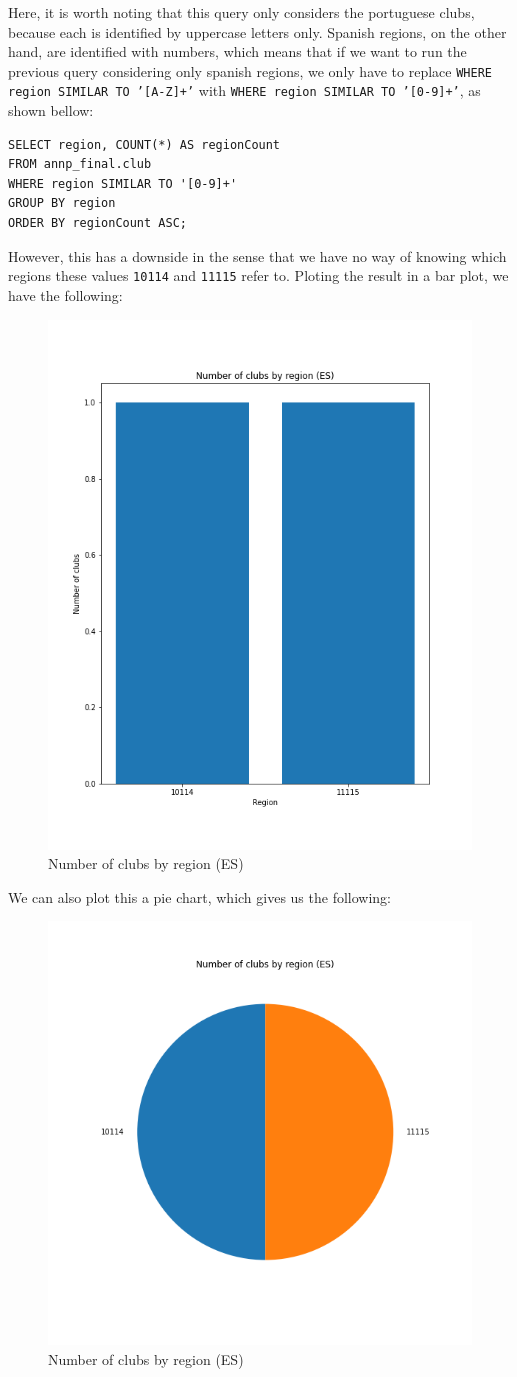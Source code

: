 Here, it is worth noting that this query only considers the portuguese clubs, because each is identified by uppercase
letters only.
Spanish regions, on the other hand, are identified with numbers, which means that if we want to run the previous query
considering only spanish regions, we only have to replace \texttt{WHERE region SIMILAR TO '[A-Z]+'} with
\texttt{WHERE region SIMILAR TO '[0-9]+'}, as shown bellow:

\begin{verbatim}
SELECT region, COUNT(*) AS regionCount
FROM annp_final.club
WHERE region SIMILAR TO '[0-9]+'
GROUP BY region
ORDER BY regionCount ASC;
\end{verbatim}

However, this has a downside in the sense that we have no way of knowing which regions these values \texttt{10114} and
\texttt{11115} refer to.
Ploting the result in a bar plot, we have the following:

\begin{figure}[H]
    \centering
    \includegraphics[width=.5\textwidth]{img/clubsbyregion-es}
    \caption{Number of clubs by region (ES)}
    \label{fig:clubs-by-region-es}
\end{figure}

We can also plot this a pie chart, which gives us the following:

\begin{figure}[H]
    \centering
    \includegraphics[width=.5\textwidth]{img/clubsbyregion-es-pie}
    \caption{Number of clubs by region (ES)}
    \label{fig:clubs-by-region-es-pie}
\end{figure}

